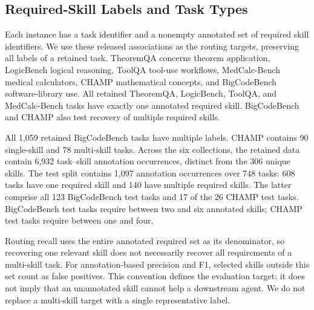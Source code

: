 \subsection{Required-Skill Labels and Task Types}
\label{app:data-labels}
Each instance has a task identifier and a nonempty annotated set of required skill identifiers. We use these released associations as the routing targets, preserving all labels of a retained task. TheoremQA concerns theorem application, LogicBench logical reasoning, ToolQA tool-use workflows, MedCalc-Bench medical calculators, CHAMP mathematical concepts, and BigCodeBench software-library use. All retained TheoremQA, LogicBench, ToolQA, and MedCalc-Bench tasks have exactly one annotated required skill. BigCodeBench and CHAMP also test recovery of multiple required skills.

All 1,059 retained BigCodeBench tasks have multiple labels. CHAMP contains 90 single-skill and 78 multi-skill tasks. Across the six collections, the retained data contain 6,932 task--skill annotation occurrences, distinct from the 306 unique skills. The test split contains 1,097 annotation occurrences over 748 tasks: 608 tasks have one required skill and 140 have multiple required skills. The latter comprise all 123 BigCodeBench test tasks and 17 of the 26 CHAMP test tasks. BigCodeBench test tasks require between two and six annotated skills; CHAMP test tasks require between one and four.

Routing recall uses the entire annotated required set as its denominator, so recovering one relevant skill does not necessarily recover all requirements of a multi-skill task. For annotation-based precision and F1, selected skills outside this set count as false positives. This convention defines the evaluation target; it does not imply that an unannotated skill cannot help a downstream agent. We do not replace a multi-skill target with a single representative label.

